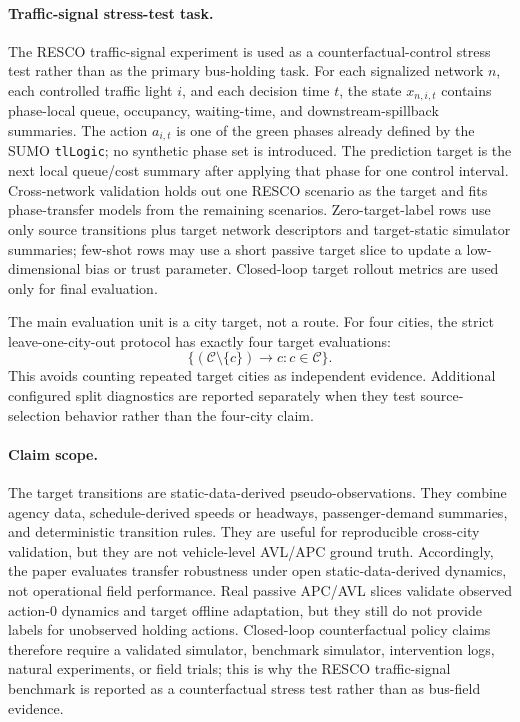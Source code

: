 \paragraph{Traffic-signal stress-test task.}
The RESCO traffic-signal experiment is used as a counterfactual-control stress test rather than as the primary bus-holding task.
For each signalized network $n$, each controlled traffic light $i$, and each decision time $t$, the state $x_{n,i,t}$ contains phase-local queue, occupancy, waiting-time, and downstream-spillback summaries.
The action $a_{i,t}$ is one of the green phases already defined by the SUMO \texttt{tlLogic}; no synthetic phase set is introduced.
The prediction target is the next local queue/cost summary after applying that phase for one control interval.
Cross-network validation holds out one RESCO scenario as the target and fits phase-transfer models from the remaining scenarios.
Zero-target-label rows use only source transitions plus target network descriptors and target-static simulator summaries; few-shot rows may use a short passive target slice to update a low-dimensional bias or trust parameter.
Closed-loop target rollout metrics are used only for final evaluation.

The main evaluation unit is a city target, not a route.
For four cities, the strict leave-one-city-out protocol has exactly four target evaluations:
\[
    \{(\mathcal{C}\setminus\{c\}) \rightarrow c : c \in \mathcal{C}\}.
\]
This avoids counting repeated target cities as independent evidence.
Additional configured split diagnostics are reported separately when they test source-selection behavior rather than the four-city claim.

\paragraph{Claim scope.}
The target transitions are static-data-derived pseudo-observations.
They combine agency data, schedule-derived speeds or headways, passenger-demand summaries, and deterministic transition rules.
They are useful for reproducible cross-city validation, but they are not vehicle-level AVL/APC ground truth.
Accordingly, the paper evaluates transfer robustness under open static-data-derived dynamics, not operational field performance.
Real passive APC/AVL slices validate observed action-$0$ dynamics and target offline adaptation, but they still do not provide labels for unobserved holding actions.
Closed-loop counterfactual policy claims therefore require a validated simulator, benchmark simulator, intervention logs, natural experiments, or field trials; this is why the RESCO traffic-signal benchmark is reported as a counterfactual stress test rather than as bus-field evidence.

